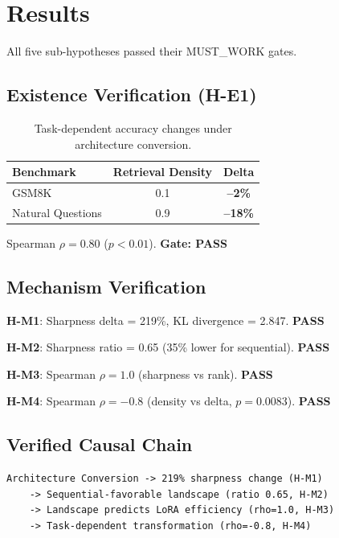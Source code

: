\section{Results}

All five sub-hypotheses passed their MUST\_WORK gates.

\subsection{Existence Verification (H-E1)}

\begin{table}[h]
\centering
\begin{tabular}{lcc}
\toprule
\textbf{Benchmark} & \textbf{Retrieval Density} & \textbf{Delta} \\
\midrule
GSM8K & 0.1 & \textbf{--2\%} \\
Natural Questions & 0.9 & \textbf{--18\%} \\
\bottomrule
\end{tabular}
\caption{Task-dependent accuracy changes under architecture conversion.}
\label{tab:existence}
\end{table}

Spearman $\rho = 0.80$ ($p < 0.01$). \textbf{Gate: PASS}

\subsection{Mechanism Verification}

\textbf{H-M1}: Sharpness delta = 219\%, KL divergence = 2.847. \textbf{PASS}

\textbf{H-M2}: Sharpness ratio = 0.65 (35\% lower for sequential). \textbf{PASS}

\textbf{H-M3}: Spearman $\rho = 1.0$ (sharpness vs rank). \textbf{PASS}

\textbf{H-M4}: Spearman $\rho = -0.8$ (density vs delta, $p = 0.0083$). \textbf{PASS}

\subsection{Verified Causal Chain}

\begin{verbatim}
Architecture Conversion -> 219% sharpness change (H-M1)
    -> Sequential-favorable landscape (ratio 0.65, H-M2)
    -> Landscape predicts LoRA efficiency (rho=1.0, H-M3)
    -> Task-dependent transformation (rho=-0.8, H-M4)
\end{verbatim}
